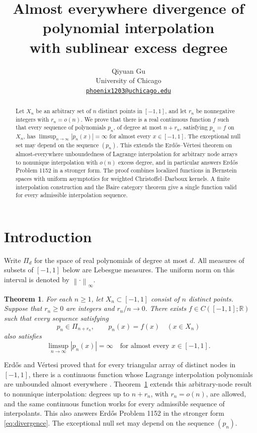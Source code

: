 \documentclass[11pt]{article}
\title{Almost everywhere divergence of polynomial interpolation\\
with sublinear excess degree}
\author{Qiyuan Gu\\
University of Chicago\\
\href{mailto:phoenix1203@uchicago.edu}{\texttt{phoenix1203@uchicago.edu}}}
\date{}
\newtheorem{theorem}{Theorem}
\theoremstyle{definition}
\numberwithin{equation}{section}
\newcommand{\R}{\mathbb R}
\newcommand{\norm}[1]{\left\lVert #1\right\rVert}
\begin{document}
\maketitle

\begin{abstract}
Let \(X_n\) be an arbitrary set of \(n\) distinct points in \([-1,1]\),
and let \(r_n\) be nonnegative integers with \(r_n=o(n)\).
We prove that there is a real continuous function \(f\) such that every
sequence of polynomials \(p_n\), of degree at most \(n+r_n\), satisfying
\(p_n=f\) on \(X_n\), has
\(\limsup_{n\to\infty}|p_n(x)|=\infty\) for almost every \(x\in[-1,1]\).
The exceptional null set may depend on the sequence \((p_n)\).
This extends the Erd\H{o}s--V\'ertesi theorem on almost-everywhere
unboundedness of Lagrange interpolation for arbitrary node arrays to
nonunique interpolation with \(o(n)\) excess degree, and in particular
answers Erd\H{o}s Problem 1152 in a stronger form. The proof combines
localized functions in Bernstein spaces with uniform asymptotics for
weighted Christoffel--Darboux kernels. A finite interpolation construction
and the Baire category theorem give a single function valid for every
admissible interpolation sequence.
\end{abstract}

\section{Introduction}

Write \(\Pi_d\) for the space of real polynomials of degree at most \(d\).
All measures of subsets of \([-1,1]\) below are Lebesgue measures.
The uniform norm on this interval is denoted by \(\norm{\cdot}_\infty\).

\begin{theorem}\label{thm:main}
For each \(n\ge1\), let \(X_n\subset[-1,1]\) consist of \(n\) distinct
points. Suppose that \(r_n\ge0\) are integers and \(r_n/n\to0\).
There exists \(f\in C([-1,1];\R)\) such that every sequence satisfying
\[
 p_n\in\Pi_{n+r_n},
 \qquad p_n(x)=f(x)\quad(x\in X_n)
\]
also satisfies
\begin{equation}\label{eq:divergence}
 \limsup_{n\to\infty}|p_n(x)|=\infty
 \quad\text{for almost every }x\in[-1,1].
\end{equation}
\end{theorem}

Erd\H{o}s and V\'ertesi proved that for every triangular array of
distinct nodes in \([-1,1]\), there is a continuous function whose
Lagrange interpolation polynomials are unbounded almost everywhere
\cite{EV80,EV81}. Theorem~\ref{thm:main} extends this arbitrary-node
result to nonunique interpolation: degrees up to \(n+r_n\), with
\(r_n=o(n)\), are allowed, and the same continuous function works for
every admissible sequence of interpolants. This also answers
Erd\H{o}s Problem 1152 \cite{Erdos1152} in the stronger form
\eqref{eq:divergence}. The exceptional null set may depend on the
sequence \((p_n)\).
\end{document}
